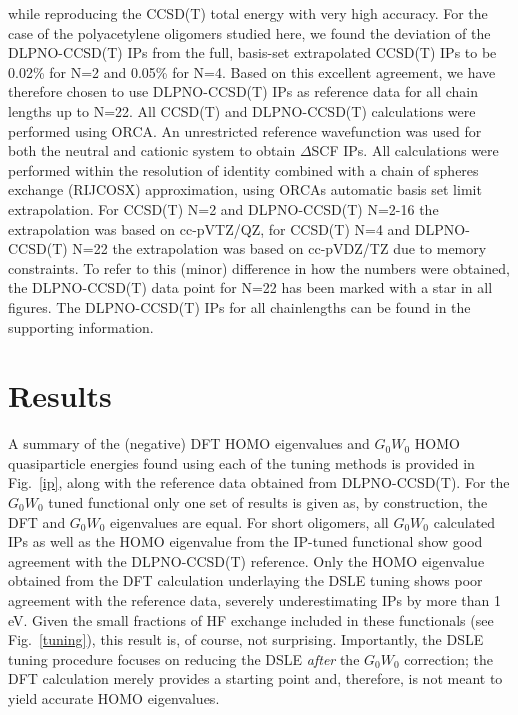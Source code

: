 \documentclass[journal=jctcce,manuscript=article,layout=twocolumn]{achemso}
\begin{document}
while reproducing the CCSD(T) total energy with very high accuracy.\cite{dlpno1,dlpno2,dlpno3} For the case of the polyacetylene oligomers studied here, we found the deviation of the DLPNO-CCSD(T) IPs from the full, basis-set extrapolated CCSD(T) IPs to be 0.02\% for N=2 and 0.05\% for N=4. Based on this excellent agreement, we have therefore chosen to use DLPNO-CCSD(T) IPs as reference data for all chain lengths up to N=22. 
All CCSD(T) and DLPNO-CCSD(T) calculations were performed using ORCA.\cite{orca} An unrestricted reference wavefunction was used for both the neutral and cationic system to obtain $\Delta$SCF IPs. All calculations were performed within
the resolution of identity combined with a chain of spheres exchange (RIJCOSX)\cite{rijcosx} approximation, using ORCAs automatic basis set limit extrapolation. For CCSD(T) N=2 and DLPNO-CCSD(T) N=2-16 the extrapolation was based on cc-pVTZ/QZ\cite{cc-PVTZ/C}, for CCSD(T) N=4 and DLPNO-CCSD(T) N=22 the extrapolation
was based on cc-pVDZ/TZ due to memory constraints. To refer to this (minor) difference in how the numbers were obtained, the DLPNO-CCSD(T) data point for N=22 has been marked with a star in all figures. The DLPNO-CCSD(T) IPs for all chainlengths can be found in the supporting information. 

\section{Results}
A summary of the (negative) DFT HOMO eigenvalues and $G_0W_0$ HOMO quasiparticle energies found using each of the tuning methods is provided in Fig.~\ref{ip}, along with the reference data obtained from DLPNO-CCSD(T). For the $G_0W_0$ tuned functional only one set of results is given as, by construction, the DFT and $G_0W_0$ eigenvalues are equal. For short oligomers, all $G_0W_0$ calculated
IPs as well as the HOMO eigenvalue from the IP-tuned functional show good agreement with the DLPNO-CCSD(T) reference. Only the HOMO eigenvalue obtained from the DFT calculation underlaying the DSLE tuning shows poor agreement with the reference data, severely underestimating IPs by more than 1 eV. Given the small fractions of HF exchange included in these functionals (see Fig.~\ref{tuning}), this result is, of course, not surprising. Importantly, the DSLE tuning procedure focuses on reducing the DSLE {\sl after} the $G_0W_0$ correction; the DFT calculation merely provides a starting point and, therefore, is not meant to yield accurate HOMO eigenvalues.
\end{document}
